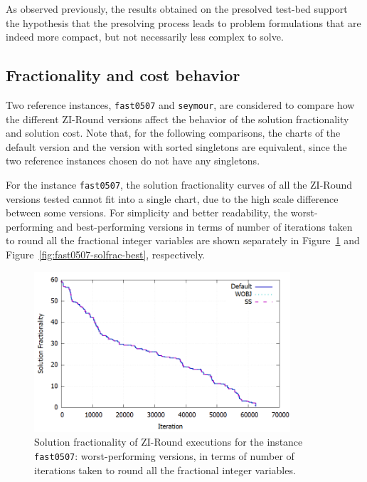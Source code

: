 \documentclass[a4paper,12pt,twoside]{scrbook}
\begin{document}
As observed previously, the results obtained on the presolved test-bed support the hypothesis that the presolving process leads to problem formulations that are indeed more compact, but not necessarily less complex to solve.

\subsection{Fractionality and cost behavior}

Two reference instances, \texttt{fast0507} and \texttt{seymour}, are considered to compare how the different ZI-Round versions affect the behavior of the solution fractionality and solution cost. Note that, for the following comparisons, the charts of the default version and the version with sorted singletons are equivalent, since the two reference instances chosen do not have any singletons. \par

For the instance \texttt{fast0507}, the solution fractionality curves of all the ZI-Round versions tested cannot fit into a single chart, due to the high scale difference between some versions. For simplicity and better readability, the worst-performing and best-performing versions in terms of number of iterations taken to round all the fractional integer variables are shown separately in Figure~\ref{fig:fast0507-solfrac-worst} and Figure~\ref{fig:fast0507-solfrac-best}, respectively.

\begin{figure}[ht]
	\centering
	\includegraphics[width=0.85\textwidth]{fast0507-solfrac-worst.png}
	\caption{Solution fractionality of ZI-Round executions for the instance \texttt{fast0507}: worst-performing versions, in terms of number of iterations taken to round all the fractional integer variables.}
	\label{fig:fast0507-solfrac-worst}
\end{figure}
\end{document}

